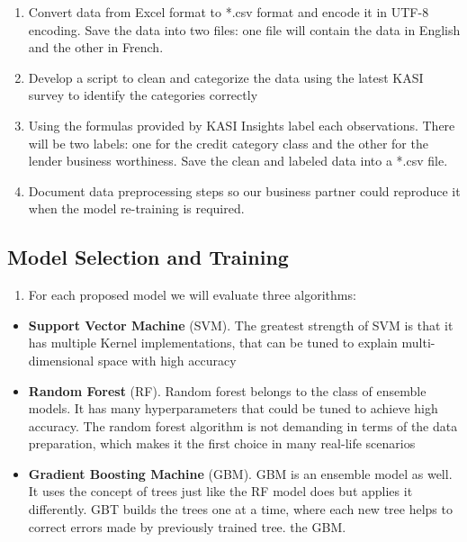 \begin{enumerate}
\def\labelenumi{\arabic{enumi}.}
\tightlist
\item
  Convert data from Excel format to *.csv format and encode it in UTF-8
  encoding. Save the data into two files: one file will contain the data
  in English and the other in French.
\item
  Develop a script to clean and categorize the data using the latest
  KASI survey to identify the categories correctly
\item
  Using the formulas provided by KASI Insights label each observations.
  There will be two labels: one for the credit category class and the
  other for the lender business worthiness. Save the clean and labeled
  data into a *.csv file.
\item
  Document data preprocessing steps so our business partner could
  reproduce it when the model re-training is required.
\end{enumerate}

\hypertarget{model-selection-and-training}{%
\subsection{Model Selection and
Training}\label{model-selection-and-training}}

\begin{enumerate}
\def\labelenumi{\arabic{enumi}.}
\tightlist
\item
  For each proposed model we will evaluate three algorithms:
\end{enumerate}

\begin{itemize}
\tightlist
\item
  \textbf{Support Vector Machine} (SVM). The greatest strength of SVM is
  that it has multiple Kernel implementations, that can be tuned to
  explain multi-dimensional space with high accuracy
\item
  \textbf{Random Forest} (RF). Random forest belongs to the class of
  ensemble models. It has many hyperparameters that could be tuned to
  achieve high accuracy. The random forest algorithm is not demanding in
  terms of the data preparation, which makes it the first choice in many
  real-life scenarios
\item
  \textbf{Gradient Boosting Machine} (GBM). GBM is an ensemble model as
  well. It uses the concept of trees just like the RF model does but
  applies it differently. GBT builds the trees one at a time, where each
  new tree helps to correct errors made by previously trained tree. the
  GBM.
\end{itemize}

